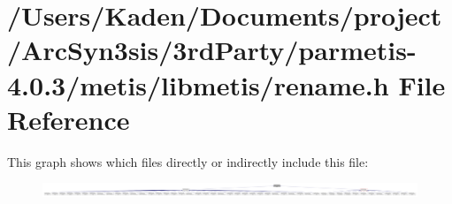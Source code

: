 \hypertarget{a00957}{}\section{/\+Users/\+Kaden/\+Documents/project/\+Arc\+Syn3sis/3rd\+Party/parmetis-\/4.0.3/metis/libmetis/rename.h File Reference}
\label{a00957}
This graph shows which files directly or indirectly include this file\+:\nopagebreak
\begin{figure}[H]
\begin{center}
\leavevmode
\includegraphics[width=350pt]{a00959}
\end{center}
\end{figure}

